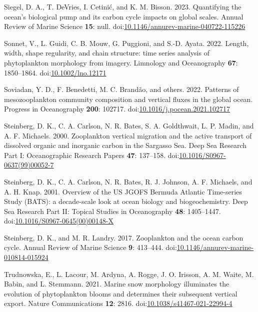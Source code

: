 \documentclass[
  letterpaper,
  DIV=11,
  numbers=noendperiod]{scrartcl}
\newlength{\cslhangindent}
\newlength{\cslentryspacingunit} %
\newenvironment{CSLReferences}[2] %
 {%
  \setlength{\parindent}{0pt}
  \ifodd #1
  \let\oldpar\par
  \def\par{\hangindent=\cslhangindent\oldpar}
  \fi
  \setlength{\parskip}{#2\cslentryspacingunit}
 }%
 {}
\begin{document}
\begin{CSLReferences}{1}{0}
\leavevmode{}%
Siegel, D. A., T. DeVries, I. Cetinić, and K. M. Bisson. 2023.
Quantifying the ocean's biological pump and its carbon cycle impacts on
global scales. Annual Review of Marine Science \textbf{15}: null.
doi:\href{https://doi.org/10.1146/annurev-marine-040722-115226}{10.1146/annurev-marine-040722-115226}

\leavevmode{}%
Sonnet, V., L. Guidi, C. B. Mouw, G. Puggioni, and S.-D. Ayata. 2022.
Length, width, shape regularity, and chain structure: time series
analysis of phytoplankton morphology from imagery. Limnology and
Oceanography \textbf{67}: 1850--1864.
doi:\href{https://doi.org/10.1002/lno.12171}{10.1002/lno.12171}

\leavevmode{}%
Soviadan, Y. D., F. Benedetti, M. C. Brandão, and others. 2022. Patterns
of mesozooplankton community composition and vertical fluxes in the
global ocean. Progress in Oceanography \textbf{200}: 102717.
doi:\href{https://doi.org/10.1016/j.pocean.2021.102717}{10.1016/j.pocean.2021.102717}

\leavevmode{}%
Steinberg, D. K., C. A. Carlson, N. R. Bates, S. A. Goldthwait, L. P.
Madin, and A. F. Michaels. 2000. Zooplankton vertical migration and the
active transport of dissolved organic and inorganic carbon in the
Sargasso Sea. Deep Sea Research Part I: Oceanographic Research Papers
\textbf{47}: 137--158.
doi:\href{https://doi.org/10.1016/S0967-0637(99)00052-7}{10.1016/S0967-0637(99)00052-7}

\leavevmode{}%
Steinberg, D. K., C. A. Carlson, N. R. Bates, R. J. Johnson, A. F.
Michaels, and A. H. Knap. 2001. Overview of the US JGOFS Bermuda
Atlantic Time-series Study (BATS): a decade-scale look at ocean biology
and biogeochemistry. Deep Sea Research Part II: Topical Studies in
Oceanography \textbf{48}: 1405--1447.
doi:\href{https://doi.org/10.1016/S0967-0645(00)00148-X}{10.1016/S0967-0645(00)00148-X}

\leavevmode{}%
Steinberg, D. K., and M. R. Landry. 2017. Zooplankton and the ocean
carbon cycle. Annual Review of Marine Science \textbf{9}: 413--444.
doi:\href{https://doi.org/10.1146/annurev-marine-010814-015924}{10.1146/annurev-marine-010814-015924}

\leavevmode{}%
Trudnowska, E., L. Lacour, M. Ardyna, A. Rogge, J. O. Irisson, A. M.
Waite, M. Babin, and L. Stemmann. 2021. Marine snow morphology
illuminates the evolution of phytoplankton blooms and determines their
subsequent vertical export. Nature Communications \textbf{12}: 2816.
doi:\href{https://doi.org/10.1038/s41467-021-22994-4}{10.1038/s41467-021-22994-4}


\end{CSLReferences}
\end{document}
